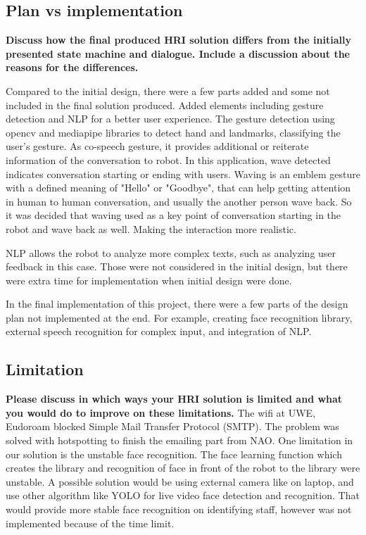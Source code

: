 \documentclass[conference]{IEEEtran}
\begin{document}
\subsection{Plan vs implementation}
\textbf{Discuss how the final produced HRI solution differs from the initially presented state machine and dialogue. Include a discussion about the reasons for the differences.}

Compared to the initial design, there were a few parts added and some not included in the final solution produced. Added elements including gesture detection and NLP for a better user experience. The gesture detection using opencv and mediapipe libraries to detect hand and landmarks, classifying the user's gesture. As co-speech gesture, it provides additional or reiterate information of the conversation to robot. In this application, wave detected indicates conversation starting or ending with users. Waving is an emblem gesture with a defined meaning of "Hello" or "Goodbye", that can help getting attention in human to human conversation, and usually the another person wave back. So it was decided that waving used as a key point of conversation starting in the robot and wave back as well. Making the interaction more realistic.

NLP allows the robot to analyze more complex texts, such as analyzing user feedback in this case. Those were not considered in the initial design, but there were extra time for implementation when initial design were done.

In the final implementation of this project, there were a few parts of the design plan not implemented at the end. For example, creating face recognition library, external speech recognition for complex input, and integration of NLP.

\subsection{Limitation}
\textbf{Please discuss in which ways your HRI solution is limited and what you would do to improve on these limitations.}
The wifi at UWE, Eudoroam blocked Simple Mail Transfer Protocol (SMTP). The problem was solved with hotspotting to finish the emailing part from NAO. 
One limitation in our solution is the unstable face recognition. The face learning function which creates the library and recognition of face in front of the robot to the library were unstable. A possible solution would be using external camera like on laptop, and use other algorithm like YOLO for live video face detection and recognition. That would provide more stable face recognition on identifying staff, however was not implemented because of the time limit. 
\end{document}
